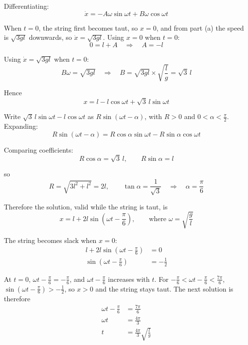 \documentclass[leqno]{article}
\begin{document}
\begin{enumerate}[
  label=\textbf{\arabic*.},
  leftmargin=*,
  topsep=0pt,
  partopsep=0pt,
  parsep=0pt
]
\begin{djsSolution}
\begin{enumerate}[label=\textbf{(\alph*)}, start=1]
Differentiating:
\[
\dot{x}=-A\omega\sin\omega t+B\omega\cos\omega t
\]

When \(t=0\), the string first becomes taut, so \(x=0\), and from part (a) the speed is \(\sqrt{3gl}\) downwards, so \(\dot{x}=\sqrt{3gl}\). Using \(x=0\) when \(t=0\):
\[
0=l+A\quad\Longrightarrow\quad A=-l
\]

Using \(\dot{x}=\sqrt{3gl}\) when \(t=0\):
\[
B\omega=\sqrt{3gl}\quad\Longrightarrow\quad B=\sqrt{3gl}\times\sqrt{\frac{l}{g}}=\sqrt{3}\,l
\]

Hence
\[
x=l-l\cos\omega t+\sqrt{3}\,l\sin\omega t
\]

Write \(\sqrt{3}\,l\sin\omega t-l\cos\omega t\) as \(R\sin(\omega t-\alpha)\), with \(R>0\) and \(0<\alpha<\frac{\pi}{2}\). Expanding:
\[
R\sin(\omega t-\alpha)=R\cos\alpha\sin\omega t-R\sin\alpha\cos\omega t
\]

Comparing coefficients:
\[
R\cos\alpha=\sqrt{3}\,l,\qquad R\sin\alpha=l
\]

so
\[
R=\sqrt{3l^2+l^2}=2l,\qquad \tan\alpha=\frac{1}{\sqrt{3}}\quad\Longrightarrow\quad\alpha=\frac{\pi}{6}
\]

Therefore the solution, valid while the string is taut, is
\[
x=l+2l\sin\left(\omega t-\frac{\pi}{6}\right),\qquad\text{where }\omega=\sqrt{\frac{g}{l}}
\]

The string becomes slack when \(x=0\):
\begin{align*}
l+2l\sin\left(\omega t-\frac{\pi}{6}\right)&=0\\
\sin\left(\omega t-\frac{\pi}{6}\right)&=-\frac12
\end{align*}

At \(t=0\), \(\omega t-\frac{\pi}{6}=-\frac{\pi}{6}\), and \(\omega t-\frac{\pi}{6}\) increases with \(t\). For \(-\frac{\pi}{6}<\omega t-\frac{\pi}{6}<\frac{7\pi}{6}\), \(\sin\left(\omega t-\frac{\pi}{6}\right)>-\frac12\), so \(x>0\) and the string stays taut. The next solution is therefore
\begin{align*}
\omega t-\frac{\pi}{6}&=\frac{7\pi}{6}\\
\omega t&=\frac{4\pi}{3}\\
t&=\frac{4\pi}{3}\sqrt{\frac{l}{g}}
\end{align*}
\end{enumerate}
\end{djsSolution}

\end{enumerate}
\end{document}
